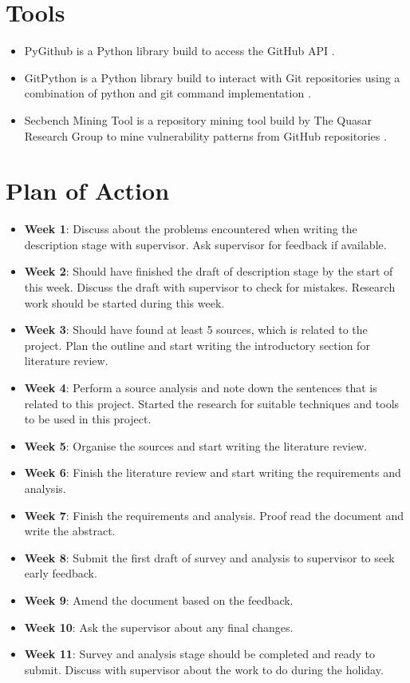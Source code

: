\documentclass[12pt, a4paper]{report}
\begin{document}
\section{Tools}
\begin{itemize}
	\item PyGithub is a Python library build to access the GitHub API \cite{pygithub}.
	\item GitPython is a Python library build to interact with Git repositories using a combination of
	python and git command implementation \cite{gitpython}.
	\item Secbench Mining Tool is a repository mining tool build by The Quasar Research Group to mine
	vulnerability patterns from GitHub repositories \cite{secbench}.
\end{itemize}

\section{Plan of Action}
\begin{itemize}
	\item \textbf{Week 1}: Discuss about the problems encountered when writing the description stage
	with supervisor. Ask supervisor for feedback if available.
	\item \textbf{Week 2}: Should have finished the draft of description stage by the start of this
	week. Discuss the draft with supervisor to check for mistakes. Research work should be started
	during this week.
	\item \textbf{Week 3}: Should have found at least 5 sources, which is related to the project. Plan
	the outline and start writing the introductory section for literature review.
	\item \textbf{Week 4}: Perform a source analysis and note down the sentences that is related to
	this project. Started the research for suitable techniques and tools to be used in this project.
	\item \textbf{Week 5}: Organise the sources and start writing the literature review.
	\item \textbf{Week 6}: Finish the literature review and start writing the requirements and
	analysis.
	\item \textbf{Week 7}: Finish the requirements and analysis. Proof read the document and write the
	abstract.
	\item \textbf{Week 8}: Submit the first draft of survey and analysis to supervisor to seek early
	feedback.
	\item \textbf{Week 9}: Amend the document based on the feedback.
	\item \textbf{Week 10}: Ask the supervisor about any final changes.
	\item \textbf{Week 11}: Survey and analysis stage should be completed and ready to submit. Discuss
	with supervisor about the work to do during the holiday.
\end{itemize}
\end{document}
